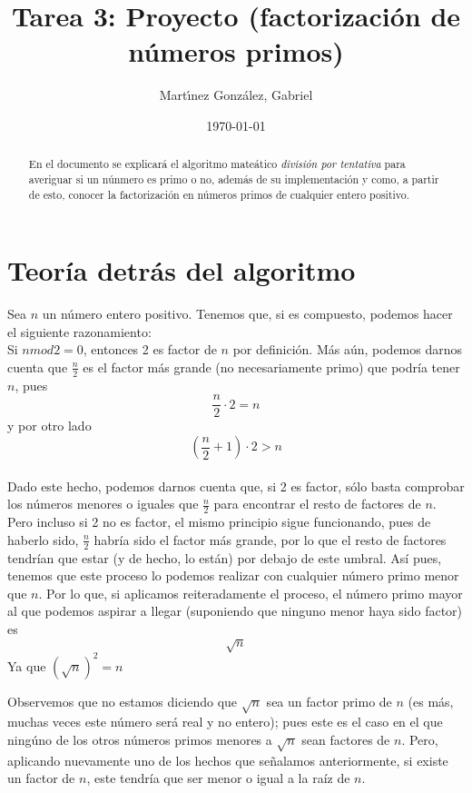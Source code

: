 \documentclass[12pt]{article}
\author{Mart\'{\i}nez Gonz\'alez, Gabriel}
\date{\today}
\title{Tarea 3: Proyecto (factorizaci\'on de n\'umeros primos)}
\begin{document}
\maketitle
\begin{abstract}

	En el documento se explicará el algoritmo mate\'atico \textit{divisi\'on por tentativa} para averiguar si un n\'unmero es primo o no, adem\'as de su implementaci\'on y como, a partir de esto, conocer la factorizaci\'on en n\'umeros primos de cualquier entero positivo.

\end{abstract}

\section{Teor\'{i}a detr\'as del algoritmo}

Sea $n$ un n\'umero entero positivo. Tenemos que, si es compuesto, podemos hacer el siguiente razonamiento:\\
Si $n mod 2=0$, entonces 2 es factor de $n$ por definici\'on. M\'as a\'un, podemos darnos cuenta que $\frac{n}{2}$ es el factor m\'as grande (no necesariamente primo) que podría tener $n$, pues 
$$\frac{n}{2}\cdot 2=n$$
y por otro lado
$$\left(\frac{n}{2} +1\right)\cdot 2>n$$
\\
Dado este hecho, podemos darnos cuenta que, si 2 es factor, s\'olo basta comprobar los n\'umeros menores o iguales que $\frac{n}{2}$ para encontrar el resto de factores de $n$. Pero incluso si 2 no es factor, el mismo principio sigue funcionando, pues de haberlo sido, $\frac{n}{2}$ habría sido el factor m\'as grande, por lo que el resto de factores tendr\'{i}an que estar (y de hecho, lo est\'an) por debajo de este umbral.  
As\'{i} pues, tenemos que este proceso lo podemos realizar con cualquier n\'umero primo menor que $n$. Por lo que, si aplicamos reiteradamente el proceso, el n\'umero primo mayor al que podemos aspirar a llegar (suponiendo que ninguno menor haya sido factor) es
$$\sqrt{n}$$
Ya que $(\sqrt{n})^2=n$

Observemos que no estamos diciendo que $\sqrt{n}$ sea un factor primo de $n$ (es m\'as, muchas veces este n\'umero ser\'a real y no entero); pues este es el caso en el que ning\'uno de los otros n\'umeros primos menores a $\sqrt{n}$ sean factores de $n$. Pero, aplicando nuevamente uno de los hechos que señalamos anteriormente, si existe un factor de $n$, este tendr\'{i}a que ser menor o igual a la ra\'{i}z de $n$.
\end{document}
